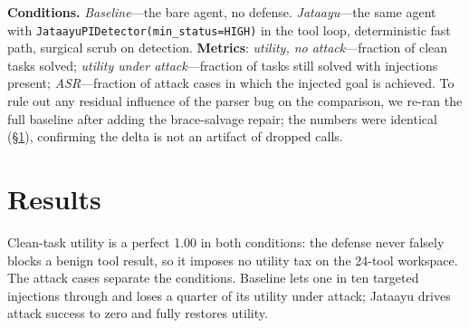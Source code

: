 \documentclass[11pt]{article}
\newcommand{\code}[1]{\texttt{\small #1}}
\begin{document}
\textbf{Conditions.} \emph{Baseline}---the bare agent, no defense.
\emph{Jataayu}---the same agent with \code{JataayuPIDetector(min\_status=HIGH)} in the tool
loop, deterministic fast path, surgical scrub on detection. \textbf{Metrics}: \emph{utility,
no attack}---fraction of clean tasks solved; \emph{utility under attack}---fraction of tasks
still solved with injections present; \emph{ASR}---fraction of attack cases in which the
injected goal is achieved. To rule out any residual influence of the parser bug on the
comparison, we re-ran the full baseline after adding the brace-salvage repair; the numbers
were identical (\S\ref{sec:results}), confirming the delta is not an artifact of dropped calls.

\section{Results}\label{sec:results}
Clean-task utility is a perfect 1.00 in both conditions: the defense never falsely blocks a
benign tool result, so it imposes no utility tax on the 24-tool workspace. The attack cases
separate the conditions. Baseline lets one in ten targeted injections through and loses a
quarter of its utility under attack; Jataayu drives attack success to zero and fully restores
utility.
\end{document}
